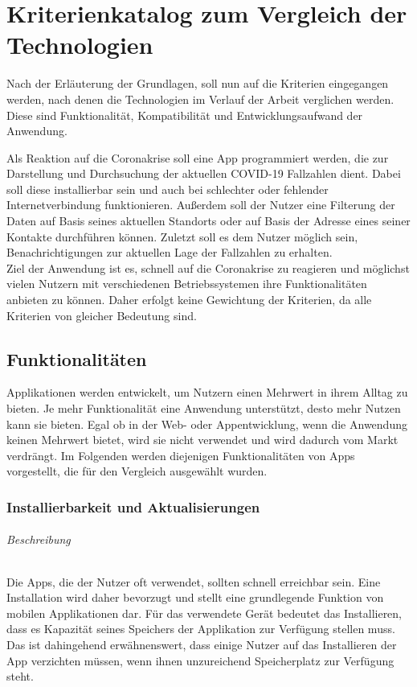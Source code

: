 \chapter{Kriterienkatalog zum Vergleich der Technologien}\label{ch:catalog}
Nach der Erläuterung der Grundlagen, soll nun auf die Kriterien eingegangen werden, nach denen die Technologien im Verlauf der Arbeit verglichen werden.
Diese sind Funktionalität, Kompatibilität und Entwicklungsaufwand der Anwendung.

Als Reaktion auf die Coronakrise soll eine App programmiert werden, die zur Darstellung und Durchsuchung der aktuellen COVID-19 Fallzahlen dient.
Dabei soll diese installierbar sein und auch bei schlechter oder fehlender Internetverbindung funktionieren.
Außerdem soll der Nutzer eine Filterung der Daten auf Basis seines aktuellen Standorts oder auf Basis der Adresse eines seiner Kontakte durchführen können.
Zuletzt soll es dem Nutzer möglich sein, Benachrichtigungen zur aktuellen Lage der Fallzahlen zu erhalten.\\
Ziel der Anwendung ist es, schnell auf die Coronakrise zu reagieren und möglichst vielen Nutzern mit verschiedenen Betriebssystemen ihre Funktionalitäten anbieten zu können.
Daher erfolgt keine Gewichtung der Kriterien, da alle Kriterien von gleicher Bedeutung sind.

\section{Funktionalitäten}
Applikationen werden entwickelt, um Nutzern einen Mehrwert in ihrem Alltag zu bieten.
Je mehr Funktionalität eine Anwendung unterstützt, desto mehr Nutzen kann sie bieten.
Egal ob in der Web- oder Appentwicklung, wenn die Anwendung keinen Mehrwert bietet, wird sie nicht verwendet und wird dadurch vom Markt verdrängt.
Im Folgenden werden diejenigen Funktionalitäten von Apps vorgestellt, die für den Vergleich ausgewählt wurden.

\subsection{Installierbarkeit und Aktualisierungen}
\subparagraph{Beschreibung\\}
Die Apps, die der Nutzer oft verwendet, sollten schnell erreichbar sein.
Eine Installation wird daher bevorzugt und stellt eine grundlegende Funktion von mobilen Applikationen dar.
Für das verwendete Gerät bedeutet das Installieren, dass es Kapazität seines Speichers der Applikation zur Verfügung stellen muss.
Das ist dahingehend erwähnenswert, dass einige Nutzer auf das Installieren der App verzichten müssen, wenn ihnen unzureichend Speicherplatz zur Verfügung steht.

